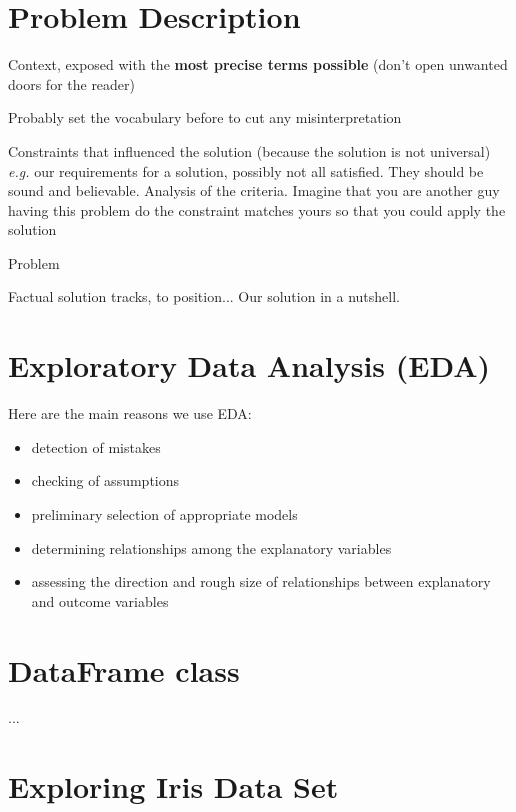 \documentclass{article}
\begin{document}
\section{Problem Description}
\label{sec:problem}

Context, exposed with the \textbf{most precise terms possible} (don't open
unwanted doors for the reader)

Probably set the vocabulary before to cut any misinterpretation

Constraints that influenced the solution (because the solution is not
universal) \emph{e.g.} our requirements for a solution, possibly not all
satisfied. They should be sound and believable. Analysis of the criteria.
Imagine that you are another guy having this problem do the constraint
matches yours so that you could apply the solution

Problem

Factual solution tracks, to position...
Our solution in a nutshell.

\section{Exploratory Data Analysis (EDA)}
\label{sec:eda}

Here are the main reasons we use EDA:
\begin{itemize}
  \item detection of mistakes
  \item checking of assumptions
  \item preliminary selection of appropriate models
  \item determining relationships among the explanatory variables
  \item assessing the direction and rough size of relationships between explanatory and outcome variables
\end{itemize}


\section{DataFrame class}
\label{sec:dataframe}
...

\section{Exploring Iris Data Set}
\label{sec:contribution}
\end{document}
